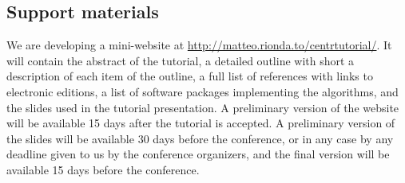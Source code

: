\documentclass[11pt]{article}
\begin{document}
\subsection*{Support materials}
We are developing a mini-website at
\url{http://matteo.rionda.to/centrtutorial/}. It will contain the
abstract of the tutorial, a detailed outline with short a description of
each item of the outline, a full list of references with links to
electronic editions, a list of software packages implementing the
algorithms, and the slides used in the tutorial presentation. A preliminary version of the
website will be available 15 days after the tutorial is accepted. A preliminary
version of the slides will be available 30 days before the conference, or in any
case by any deadline given to us by the conference organizers, and the final
version will be available 15 days before the conference.

%
%
\end{document}
